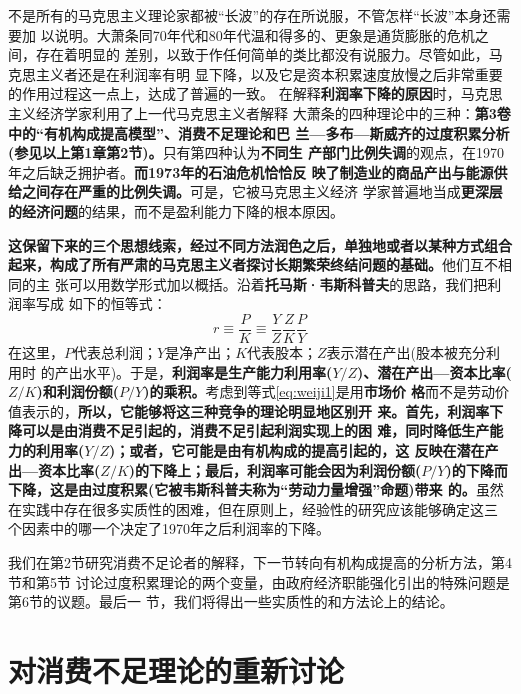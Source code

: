 不是所有的马克思主义理论家都被“长波”的存在所说服，不管怎样“长波”本身还需要加
以说明。大萧条同70年代和80年代温和得多的、更象是通货膨胀的危机之间，存在着明显的
差别，以致于作任何简单的类比都没有说服力。尽管如此，马克思主义者还是在利润率有明
显下降，以及它是资本积累速度放慢之后非常重要的作用过程这一点上，达成了普遍的一致。
在解释\textbf{利润率下降的原因}时，马克思主义经济学家利用了上一代马克思主义者解释
大萧条的四种理论中的三种：\textbf{第3卷中的“有机构成提高模型”、消费不足理论和巴
  兰—多布—斯威齐的过度积累分析(参见以上第1章第2节)。}只有第四种认为\textbf{不同生
  产部门比例失调}的观点，在1970年之后缺乏拥护者。\textbf{而1973年的石油危机恰恰反
  映了制造业的商品产出与能源供给之间存在严重的比例失调。}可是，它被马克思主义经济
学家普遍地当成\textbf{更深层的经济问题}的结果，而不是盈利能力下降的根本原因。

\textbf{这保留下来的三个思想线索，经过不同方法润色之后，单独地或者以某种方式组合
  起来，构成了所有严肃的马克思主义者探讨长期繁荣终结问题的基础。}他们互不相同的主
张可以用数学形式加以概括。沿着\textbf{托马斯·韦斯科普夫}的思路，我们把利润率写成
如下的恒等式：
\begin{equation}
  \label{eq:weiji1}
  r \equiv \frac{P}{K} \equiv \frac{Y}{Z} \frac{Z}{K} \frac{P}{Y}
\end{equation}
在这里，$P$代表总利润；$Y$是净产出；$K$代表股本；$Z$表示潜在产出(股本被充分利用时
的产出水平)。于是，\textbf{利润率是生产能力利用率($Y / Z$)、潜在产出—资本比率($Z
  / K$)和利润份额($P /Y$)的乘积。}考虑到等式\eqref{eq:weiji1}是用\textbf{市场价
  格}而不是劳动价值表示的，\textbf{所以，它能够将这三种竞争的理论明显地区别开
  来。}\textbf{首先，利润率下降可以是由消费不足引起的，消费不足引起利润实现上的困
  难，同时降低生产能力的利用率($Y / Z$)；或者，它可能是由有机构成的提高引起的，这
  反映在潜在产出—资本比率($Z / K$)的下降上；最后，利润率可能会因为利润份额($P /
  Y$)的下降而下降，这是由过度积累(它被韦斯科普夫称为“劳动力量增强”命题)带来
  的。}虽然在实践中存在很多实质性的困难，但在原则上，经验性的研究应该能够确定这三
个因素中的哪一个决定了1970年之后利润率的下降。

我们在第2节研究消费不足论者的解释，下一节转向有机构成提高的分析方法，第4节和第5节
讨论过度积累理论的两个变量，由政府经济职能强化引出的特殊问题是第6节的议题。最后一
节，我们将得出一些实质性的和方法论上的结论。

\section{对消费不足理论的重新讨论}

